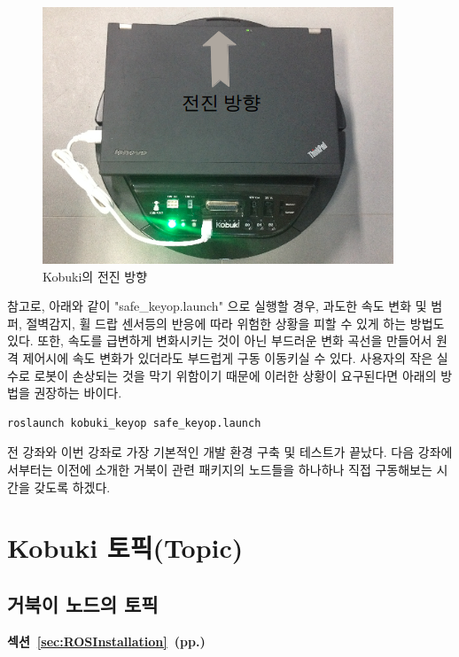 \begin{figure}[h]
\centering\includegraphics[width=0.7\columnwidth]{pictures/chapter10/kobuki_test.png}
\caption{Kobuki의 전진 방향}
\end{figure}

\vspace{\baselineskip}
\noindent
참고로, 아래와 같이 "safe\_keyop.launch" 으로 실행할 경우, 과도한 속도 변화 및 범퍼, 절벽감지, 휠 드랍 센서등의 반응에 따라 위험한 상황을 피할 수 있게 하는 방법도 있다. 또한, 속도를 급변하게 변화시키는 것이 아닌 부드러운 변화 곡선을 만들어서 원격 제어시에 속도 변화가 있더라도 부드럽게 구동 이동키실 수 있다. 사용자의 작은 실수로 로봇이 손상되는 것을 막기 위함이기 때문에 이러한 상황이 요구된다면 아래의 방법을 권장하는 바이다.

\begin{lstlisting}[language=ROS]
roslaunch kobuki_keyop safe_keyop.launch
\end{lstlisting}

전 강좌와 이번 강좌로 가장 기본적인 개발 환경 구축 및 테스트가 끝났다. 다음 강좌에서부터는 이전에 소개한 거북이 관련 패키지의 노드들을 하나하나 직접 구동해보는 시간을 갖도록 하겠다.

\section{Kobuki 토픽(Topic)}

\subsection{거북이 노드의 토픽}

\textbf{섹션~\ref{sec:ROSInstallation}~(pp.\pageref{sec:ROSInstallation})} 

